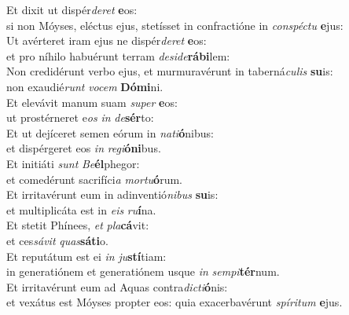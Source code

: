 \oddverse Et dixit ut dispér\textit{de}\textit{ret} \textbf{e}os:~\*\\
\oddverse si non Móyses, eléctus ejus, stetísset in confractióne in \textit{con}\textit{spé}\textit{ctu} \textbf{e}jus:\\
\evenverse Ut avérteret iram ejus ne dispér\textit{de}\textit{ret} \textbf{e}os:~\*\\
\evenverse et pro níhilo habuérunt terram \textit{de}\textit{si}\textit{de}\textbf{rá}\textbf{bi}lem:\\
\oddverse Non credidérunt verbo ejus, et murmuravérunt in taberná\textit{cu}\textit{lis} \textbf{su}is:~\*\\
\oddverse non exaudié\textit{runt} \textit{vo}\textit{cem} \textbf{Dó}\textbf{mi}ni.\\
\evenverse Et elevávit manum suam \textit{su}\textit{per} \textbf{e}os:~\*\\
\evenverse ut prostérneret e\textit{os} \textit{in} \textit{de}\textbf{sér}to:\\
\oddverse Et ut dejíceret semen eórum in \textit{na}\textit{ti}\textbf{ó}nibus:~\*\\
\oddverse et dispérgeret eos \textit{in} \textit{re}\textit{gi}\textbf{ó}\textbf{ni}bus.\\
\evenverse Et initiáti \textit{sunt} \textit{Be}\textbf{él}phegor:~\*\\
\evenverse et comedérunt sacrifíci\textit{a} \textit{mor}\textit{tu}\textbf{ó}rum.\\
\oddverse Et irritavérunt eum in adinventió\textit{ni}\textit{bus} \textbf{su}is:~\*\\
\oddverse et multiplicáta est in \textit{e}\textit{is} \textit{ru}\textbf{í}na.\\
\evenverse Et stetit Phínees, \textit{et} \textit{pla}\textbf{cá}vit:~\*\\
\evenverse et ces\textit{sá}\textit{vit} \textit{quas}\textbf{sá}\textbf{ti}o.\\
\oddverse Et reputátum est ei \textit{in} \textit{ju}\textbf{stí}tiam:~\*\\
\oddverse in generatiónem et generatiónem usque \textit{in} \textit{sem}\textit{pi}\textbf{tér}num.\\
\evenverse Et irritavérunt eum ad Aquas contra\textit{di}\textit{cti}\textbf{ó}nis:~\*\\
\evenverse et vexátus est Móyses propter eos: quia exacerbavérunt \textit{spí}\textit{ri}\textit{tum} \textbf{e}jus.\\
